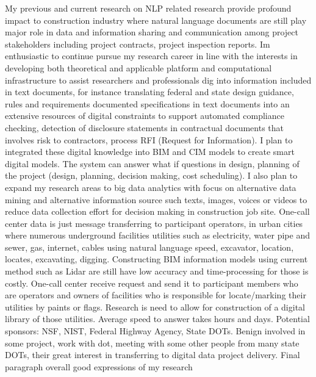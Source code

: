 \documentclass[a4paper,11pt]{article}
\begin{document}
My previous and current research on NLP related research provide profound impact to construction industry where natural language documents are still play major role in data and information sharing and communication among project stakeholders including project contracts, project inspection reports. Im enthusiastic to continue pursue my research career in line with the interests in developing both theoretical and applicable platform and computational infrastructure to assist researchers and professionals dig into information included in text documents, for instance translating federal and state design guidance, rules and requirements documented specifications in text documents into an extensive resources of digital constraints to support automated compliance checking, detection of disclosure statements in contractual documents that involves risk to contractors, process RFI (Request for Information). I plan to integrated these digital knowledge into BIM and CIM models to create smart digital models. The system can answer what if questions in design, planning of the project (design, planning, decision making, cost scheduling).
%
I also plan to expand my research areas to big data analytics with focus on alternative data mining and alternative information source such texts, images, voices or videos to reduce data collection effort for decision making in construction job site. One-call center data is just message transferring to participant operators, in urban cities where numerous underground facilities utilities such as electricity, water pipe and sewer, gas, internet, cables using natural language speed, excavator, location, locates, excavating, digging. Constructing BIM information models using current method such as Lidar are still have low accuracy and time-processing for those is costly. One-call center receive request and send it to participant members who are operators and owners of facilities who is responsible for locate/marking their utilities by paints or flags. Research is need to allow for construction of a digital library of those utilities. Average speed to answer takes hours and days.
%
%
%
Potential sponsors: NSF, NIST, Federal Highway Agency, State DOTs. Benign involved in some project, work with dot, meeting with some other people from many state DOTs, their great interest in transferring to digital data project delivery.
%
Final paragraph  overall good expressions of my research
\end{document}
